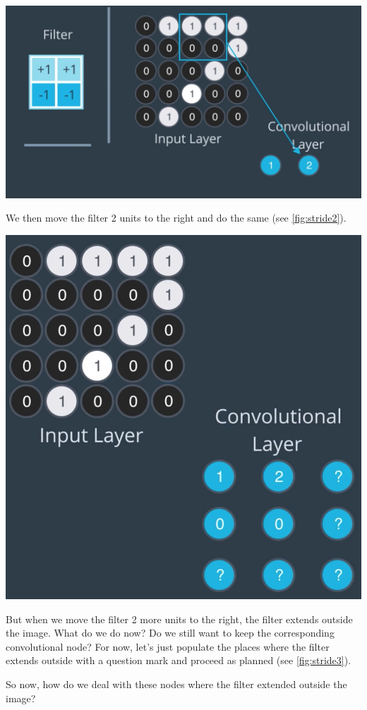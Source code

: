 \includegraphics[width=0.75\linewidth]{img//cnn//depth/stride2.png}
\label{fig:stride2}

We then move the filter 2 units to the right and do the same (see \autoref{fig:stride2}).

\includegraphics[width=0.75\linewidth]{img//cnn//depth/stride3.png}
\label{fig:stride3}

But when we move the filter 2 more units to the right, the filter extends outside the image. What do we do now? Do we still want to keep the corresponding convolutional node? For now, let's just populate the places where the filter extends outside with a question mark and proceed as planned (see \autoref{fig:stride3}). \newline

So now, how do we deal with these nodes where the filter extended outside the image? 

